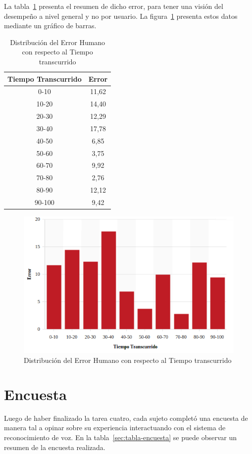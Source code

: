 La tabla~\ref{sec:error-tiempo} presenta el resumen de dicho error, para tener una visi\'on del desempe\~no a nivel
general y no por usuario. La figura~\ref{figure:gerror-tiempo} presenta estos datos mediante un gr\'afico de barras.


\begin{table}[H]
\centering
\footnotesize
\begin{tabular}{|c|c|}
\hline
    Tiempo Transcurrido & Error \\
    \hline
0-10  &  11,62 \\
10-20 &  14,40 \\
20-30 &  12,29 \\
30-40 &  17,78 \\
40-50 &  6,85 \\
50-60 &  3,75 \\
60-70 &  9,92 \\
70-80 &  2,76 \\
80-90 &  12,12 \\
90-100 & 9,42 \\
    \hline
\end{tabular}
\caption{Distribuci\'on del Error Humano con respecto al Tiempo transcurrido}
\label{sec:error-tiempo}
\end{table}

\begin{figure}[ht]
\centering
\includegraphics[width=0.6\linewidth]{./graphics/error_tiempo.png}
\caption{Distribuci\'on del Error Humano con respecto al Tiempo transcurrido}
\label{figure:gerror-tiempo}
\end{figure}


\section{Encuesta}

Luego de haber finalizado la tarea cuatro, cada sujeto complet\'o una encuesta de manera tal a
opinar sobre su experiencia interactuando con el sistema de reconocimiento de voz. 
En la tabla~\ref{sec:tabla-encuesta} se puede observar un resumen de la encuesta realizada.


